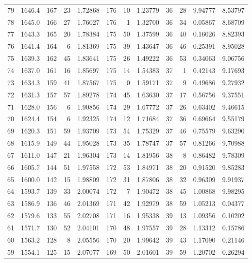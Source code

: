 \documentclass[12pt,a4paper]{article}
\begin{document}
\begin{small}
\begin{longtable}{@{}rr|rr|rr|rr|rr|rr@{}}
79 & 1646.4 & 167 & 23 & 1.72868 & 176 & 10 & 1.23779 & 36 & 28 & 9.94777 & 8.53797 \\
78 & 1645.0 & 166 & 27 & 1.76027 & 176 & 1 & 1.32700 & 36 & 34 & 0.05867 & 8.68709 \\
77 & 1643.3 & 165 & 20 & 1.78384 & 175 & 50 & 1.37599 & 36 & 40 & 0.16026 & 8.82393 \\
76 & 1641.4 & 164 & 6 & 1.81369 & 175 & 39 & 1.43647 & 36 & 46 & 0.25391 & 8.95028 \\
75 & 1639.3 & 162 & 45 & 1.83641 & 175 & 26 & 1.49222 & 36 & 53 & 0.34063 & 9.06756 \\
74 & 1637.0 & 161 & 16 & 1.85697 & 175 & 14 & 1.54383 & 37 & 1 & 0.42143 & 9.17693 \\
73 & 1634.3 & 159 & 41 & 1.87567 & 175 & 0 & 1.59171 & 37 & 9 & 0.49686 & 9.27932 \\
72 & 1631.3 & 157 & 57 & 1.89278 & 174 & 45 & 1.63630 & 37 & 17 & 0.56756 & 9.37551 \\
71 & 1628.0 & 156 & 6 & 1.90856 & 174 & 29 & 1.67772 & 37 & 26 & 0.63402 & 9.46615 \\
70 & 1624.4 & 154 & 6 & 1.92325 & 174 & 12 & 1.71684 & 37 & 36 & 0.69664 & 9.55179 \\
69 & 1620.3 & 151 & 59 & 1.93709 & 173 & 54 & 1.75329 & 37 & 46 & 0.75579 & 9.63290 \\
68 & 1615.9 & 149 & 44 & 1.95028 & 173 & 35 & 1.78747 & 37 & 57 & 0.81266 & 9.70988 \\
67 & 1611.0 & 147 & 21 & 1.96304 & 173 & 14 & 1.81956 & 38 & 8 & 0.86482 & 9.78309 \\
66 & 1605.7 & 144 & 51 & 1.97558 & 172 & 53 & 1.84971 & 38 & 20 & 0.91520 & 9.85283 \\
65 & 1600.0 & 142 & 15 & 1.98809 & 172 & 31 & 1.87806 & 38 & 32 & 0.96309 & 9.91937 \\
64 & 1593.7 & 139 & 33 & 2.00074 & 172 & 7 & 1.90472 & 38 & 45 & 1.00868 & 9.98295 \\
63 & 1586.9 & 136 & 46 & 2.01369 & 171 & 42 & 1.92979 & 38 & 59 & 1.05213 & 0.04377 \\
62 & 1579.6 & 133 & 55 & 2.02708 & 171 & 16 & 1.95338 & 39 & 13 & 1.09356 & 0.10202 \\
61 & 1571.7 & 130 & 52 & 2.04101 & 170 & 48 & 1.97557 & 39 & 28 & 1.13312 & 0.15786 \\
60 & 1563.2 & 128 & 8 & 2.05556 & 170 & 20 & 1.99642 & 39 & 43 & 1.17090 & 0.21146 \\
59 & 1554.1 & 125 & 15 & 2.07077 & 169 & 50 & 2.01601 & 39 & 59 & 1.20702 & 0.26294 \\

\end{longtable}
\end{small}
\end{document}
